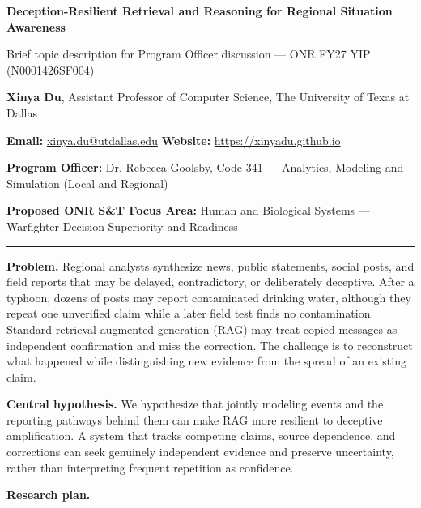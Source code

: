 \documentclass[11pt,letterpaper]{article}
\newcommand{\head}[1]{\textbf{#1}\enspace}
\newcommand{\POline}{Dr. Rebecca Goolsby, Code 341 --- Analytics, Modeling and Simulation (Local and Regional)}
\newcommand{\FocusArea}{Human and Biological Systems --- Warfighter Decision Superiority and Readiness}
\begin{document}
\begin{center}
{\fontsize{14}{16}\selectfont\bfseries Deception-Resilient Retrieval and Reasoning for Regional Situation Awareness\par}
\vspace{2pt}
{\small Brief topic description for Program Officer discussion --- ONR FY27 YIP (N0001426SF004)}
\end{center}
\vspace{-2pt}
{\small \textbf{Xinya Du}, Assistant Professor of Computer Science, The University of Texas at Dallas\par
\textbf{Email:} \href{mailto:xinya.du@utdallas.edu}{xinya.du@utdallas.edu} \quad \textbf{Website:} \href{https://xinyadu.github.io}{https://xinyadu.github.io}\par
\textbf{Program Officer:} \POline\par
\textbf{Proposed ONR S\&T Focus Area:} \FocusArea\par}
\vspace{2pt}\hrule\vspace{5pt}
\head{Problem.} Regional analysts synthesize news, public statements, social posts, and field reports that may be delayed, contradictory, or deliberately deceptive. After a typhoon, dozens of posts may report contaminated drinking water, although they repeat one unverified claim while a later field test finds no contamination. Standard retrieval-augmented generation (RAG) may treat copied messages as independent confirmation and miss the correction. The challenge is to reconstruct what happened while distinguishing new evidence from the spread of an existing claim.
\par\head{Central hypothesis.} We hypothesize that jointly modeling events and the reporting pathways behind them can make RAG more resilient to deceptive amplification. A system that tracks competing claims, source dependence, and corrections can seek genuinely independent evidence and preserve uncertainty, rather than interpreting frequent repetition as confidence.
\par\head{Research plan.}
\end{document}
